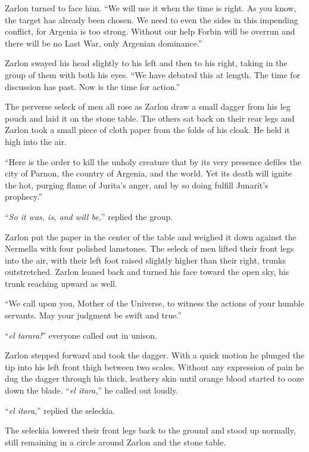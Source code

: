 Zarlon turned to face him. ``We will use it when the time is right. As you know, the target has
already been chosen. We need to even the sides in this impending conflict, for Argenia is too
strong. Without our help Forbin will be overrun and there will be no Last War, only Argenian
dominance.''

Zarlon swayed his head slightly to his left and then to his right, taking in the group of them
with both his eyes. ``We have debated this at length. The time for discussion has past. Now is
the time for action.''

The perverse seleck of men all rose as Zarlon draw a small dagger from his leg pouch and laid it
on the stone table. The others sat back on their rear legs and Zarlon took a small piece of
cloth paper from the folds of his cloak. He held it high into the air.

``Here is the order to kill the unholy creature that by its very presence defiles the city of
Parnon, the country of Argenia, and the world. Yet its death will ignite the hot, purging flame
of Jurita's anger, and by so doing fulfill Junarit's prophecy.''

``\textit{So it was, is, and will be,}'' replied the group.

Zarlon put the paper in the center of the table and weighed it down against the Nermella with
four polished lamstones. The seleck of men lifted their front legs into the air, with their left
foot raised slightly higher than their right, trunks outstretched. Zarlon leaned back and turned
his face toward the open sky, his trunk reaching upward as well.


``We call upon you, Mother of the Universe, to witness the actions of your humble servants. May
your judgment be swift and true.''

``\textit{el tarara!}'' everyone called out in unison.

Zarlon stepped forward and took the dagger. With a quick motion he plunged the tip into his left
front thigh between two scales. Without any expression of pain he dug the dagger through his
thick, leathery skin until orange blood started to ooze down the blade. ``\textit{el itara},''
he called out loudly.

``\textit{el itara},'' replied the seleckia.

The seleckia lowered their front legs back to the ground and stood up normally, still remaining
in a circle around Zarlon and the stone table.

